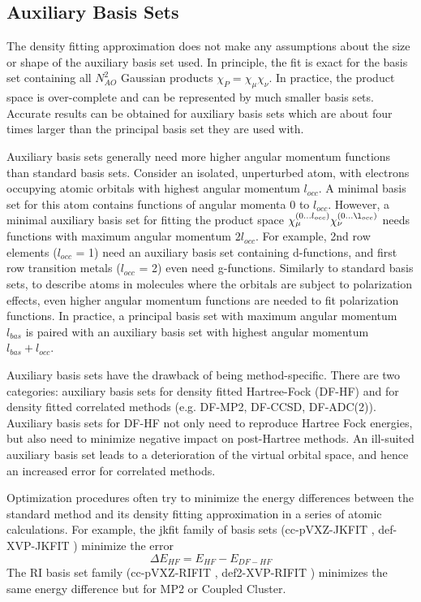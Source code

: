 \subsection{Auxiliary Basis Sets}

The density fitting approximation does not make any assumptions about the size or shape of the auxiliary basis set used. In principle, the fit is exact for the basis set containing all $N_{AO}^2$ Gaussian products $\chi_P = \chi_{\mu} \chi_{\nu}$. In practice, the product space is over-complete and can be represented by much smaller basis sets. Accurate results can be obtained for auxiliary basis sets which are about four times larger than the principal basis set they are used with. 

Auxiliary basis sets generally need more higher angular momentum functions than standard basis sets. Consider an isolated, unperturbed atom, with electrons occupying atomic orbitals with highest angular momentum $l_{occ}$. A minimal basis set for this atom contains functions of angular momenta 0 to $l_{occ}$. However, a minimal auxiliary basis set for fitting the product space $\chi_{\mu}^{(0...l_{occ})} \chi_{\nu}^{(0...\l_{occ})}$ needs functions with maximum angular momentum $2l_{occ}$. For example, 2nd row elements ($l_{occ}$ = 1) need an auxiliary basis set containing d-functions, and first row transition metals ($l_{occ}$ = 2) even need g-functions. Similarly to standard basis sets, to describe atoms in molecules where the orbitals are subject to polarization effects, even higher angular momentum functions are needed to fit polarization functions. In practice, a principal basis set with maximum angular momentum $l_{bas}$ is paired with an auxiliary basis set with highest angular momentum $l_{bas} + l_{occ}$. 

Auxiliary basis sets have the drawback of being method-specific. There are two categories: auxiliary basis sets for density fitted Hartree-Fock (DF-HF) and for density fitted correlated methods (e.g. DF-MP2, DF-CCSD, DF-ADC(2)). Auxiliary basis sets for DF-HF not only need to reproduce Hartree Fock energies, but also need to minimize negative impact on post-Hartree methods. An ill-suited auxiliary basis set leads to a deterioration of the virtual orbital space, and hence an increased error for correlated methods. 

Optimization procedures often try to minimize the energy differences between the standard method and its density fitting approximation in a series of atomic calculations. For example, the jkfit family of basis sets (cc-pVXZ-JKFIT \cite{Wei2002}, def-XVP-JKFIT \cite{Wei2008}) minimize the error
\begin{equation}
\Delta E_{HF} = E_{HF} - E_{DF-HF}
\end{equation}
The RI basis set family (cc-pVXZ-RIFIT \cite{Wei1998}, def2-XVP-RIFIT \cite{Ber1998}) minimizes the same energy difference but for MP2 or Coupled Cluster. 


